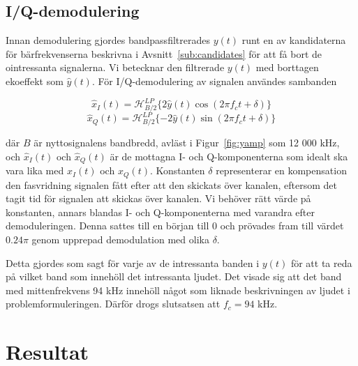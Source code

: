 \documentclass[10pt,twocolumn]{article}
\begin{document}
\subsection{I/Q-demodulering\label{sub:iq}}
Innan demodulering gjordes bandpassfiltrerades $y(t)$ runt en av kandidaterna
för bärfrekvenserna beskrivna i Avsnitt~\ref{sub:candidates} för att få bort de
ointressanta signalerna. Vi betecknar den filtrerade $y(t)$ med borttagen
ekoeffekt som $\hat{y}(t)$.
För I/Q-demodulering av signalen användes sambanden

\begin{equation*}
    \hat{x}_I(t) = \mathcal{H}_{B/2}^{LP}\{2\hat{y}(t)\cos(2\pi f_c t + \delta)\}
\end{equation*}
\begin{equation*}
    \hat{x}_Q(t) = \mathcal{H}_{B/2}^{LP}\{-2\hat{y}(t)\sin(2\pi f_c t + \delta)\}
\end{equation*}

där $B$ är nyttosignalens bandbredd, avläst i Figur~\ref{fig:yamp} som 12 000
kHz, och
$\hat{x}_I(t)$ och $\hat{x}_Q(t)$ är de mottagna I- och Q-komponenterna som
idealt ska vara lika med $x_I(t)$ och $x_Q(t)$.
Konstanten $\delta$ representerar en kompensation den fasvridning signalen fått efter
att den skickats över kanalen, eftersom det tagit tid för signalen att skickas
över kanalen. Vi behöver rätt värde på konstanten, annars
blandas I- och Q-komponenterna med varandra efter demoduleringen.
Denna sattes till en början till 0 och prövades fram till
värdet $0.24\pi$ genom upprepad demodulation med olika $\delta$.

Detta gjordes som sagt för varje av de intressanta banden i $y(t)$ för att ta
reda på vilket band som innehöll det intressanta ljudet. Det visade sig att det
band med mittenfrekvens 94 kHz innehöll något som liknade beskrivningen av
ljudet i problemformuleringen. Därför drogs slutsatsen att $f_c = 94$ kHz.


\section{Resultat}
\end{document}
